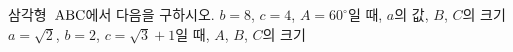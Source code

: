 삼각형~$\mathrm{ABC}$에서 다음을 구하시오.
 $b=8$, $c=4$, $A=60^\circ$일 때, $a$의 값, $B$, $C$의 크기
 $a=\sqrt{2}$, $b=2$, $c=\sqrt{3}+1$일 때, $A$, $B$, $C$의 크기
